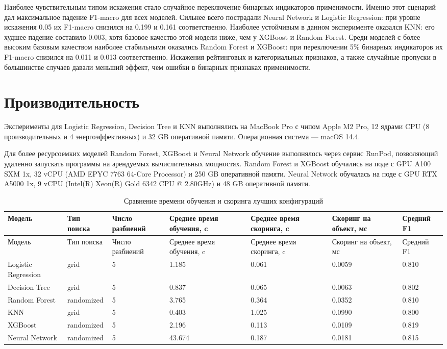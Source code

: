 \documentclass[14pt,a4paper]{extreport}
\begin{document}
Наиболее чувствительным типом искажения стало случайное переключение бинарных индикаторов применимости. Именно этот сценарий дал максимальное падение F1-macro для всех моделей. Сильнее всего пострадали Neural Network и Logistic Regression: при уровне искажения 0.05 их F1-macro снизился на 0.199 и 0.161 соответственно. Наиболее устойчивым в данном эксперименте оказался KNN: его худшее падение составило 0.003, хотя базовое качество этой модели ниже, чем у XGBoost и Random Forest. Среди моделей с более высоким базовым качеством наиболее стабильными оказались Random Forest и XGBoost: при переключении 5\% бинарных индикаторов их F1-macro снизился на 0.011 и 0.013 соответственно. Искажения рейтинговых и категориальных признаков, а также случайные пропуски в большинстве случаев давали меньший эффект, чем ошибки в бинарных признаках применимости.

\section{Производительность}

Эксперименты для Logistic Regression, Decision Tree и KNN выполнялись на MacBook Pro с чипом Apple M2 Pro, 12 ядрами CPU (8 производительных и 4 энергоэффективных) и 32 GB оперативной памяти. Операционная система --- macOS 14.4.

Для более ресурсоемких моделей Random Forest, XGBoost и Neural Network обучение выполнялось через сервис RunPod, позволяющий удаленно запускать программы на арендуемых вычислительных мощностях. Random Forest и XGBoost обучались на поде с GPU A100 SXM 1x, 32 vCPU (AMD EPYC 7763 64-Core Processor) и 250 GB оперативной памяти. Neural Network обучалась на поде с GPU RTX A5000 1x, 9 vCPU (Intel(R) Xeon(R) Gold 6342 CPU @ 2.80GHz) и 48 GB оперативной памяти.

\scriptsize
\begin{longtable}{lllllll}
\caption{Сравнение времени обучения и скоринга лучших конфигураций}\label{tab:performance}\\
\toprule
Модель & Тип поиска & Число разбиений & Среднее время обучения, c & Среднее время скоринга, c & Скоринг на объект, мс & Средний F1 \\
\midrule
\endfirsthead
\toprule
Модель & Тип поиска & Число разбиений & Среднее время обучения, c & Среднее время скоринга, c & Скоринг на объект, мс & Средний F1 \\
\midrule
\endhead
Logistic Regression & grid & 5 & 1.185 & 0.061 & 0.0059 & 0.810 \\
Decision Tree & grid & 5 & 0.837 & 0.065 & 0.0063 & 0.802 \\
Random Forest & randomized & 5 & 3.765 & 0.364 & 0.0352 & 0.810 \\
KNN & grid & 5 & 0.403 & 1.025 & 0.0990 & 0.800 \\
XGBoost & randomized & 5 & 2.196 & 0.113 & 0.0109 & 0.819 \\
Neural Network & randomized & 5 & 43.674 & 0.187 & 0.0181 & 0.815 \\
\bottomrule
\end{longtable}
\normalsize
\end{document}

